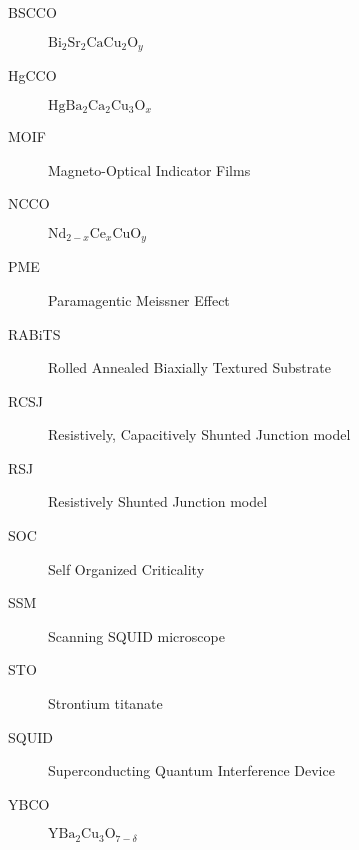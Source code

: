 

\begin{description}

\item[BSCCO] $\mathrm{Bi}_2\mathrm{Sr}_2\mathrm{CaCu}_2\mathrm{O}_y$

\item[HgCCO] $\mathrm{Hg}\mathrm{Ba}_2\mathrm{Ca}_2\mathrm{Cu}_3\mathrm{O}_x$

\item[MOIF] Magneto-Optical Indicator Films

\item[NCCO] $\mathrm{Nd}_{2-x}\mathrm{Ce}_x\mathrm{Cu}\mathrm{O}_y$

\item[PME] Paramagentic Meissner Effect

\item[RABiTS] Rolled Annealed Biaxially Textured Substrate
\item[RCSJ] Resistively, Capacitively Shunted Junction model
\item[RSJ] Resistively Shunted Junction model

\item[SOC] Self Organized Criticality
\item[SSM] Scanning SQUID microscope
\item[STO] Strontium titanate
\item[SQUID] Superconducting Quantum Interference Device

\item[YBCO] $\mathrm{Y}\mathrm{Ba}_2\mathrm{Cu}_3\mathrm{O}_{7-\delta}$

\end{description}
